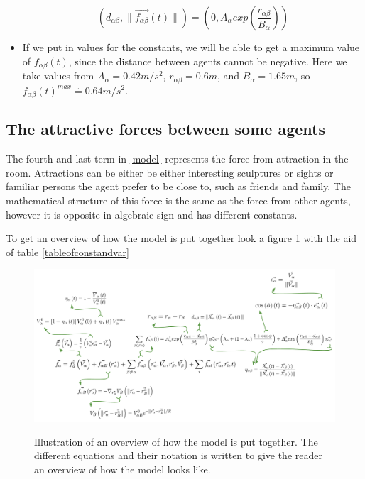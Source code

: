 \begin{itemize}
\begin{equation}
	\left( d_{\alpha \beta} , \| \vec{f_{\alpha \beta}} \left( t \right) \| \right)
 =
	\left( 0 , A_{\alpha} exp\left( \frac{r_{\alpha\beta} }{B_{\alpha}}\right)  \right) 
\end{equation}

\item If we put in values for the constants, we will be able to get a maximum value of $ f_{\alpha\beta}(t) $, 
since the distance between agents cannot be negative. Here we take values from \cite{ABconstant} $ A_{\alpha} = 0.42 m/s^{2} $, 
$ r_{\alpha\beta} = 0.6 m $, and $ B_{\alpha} = 1.65 m $, so 
$ f_{\alpha\beta}(t)^{max} \doteq 0.64 m/s^{2} $.

\end{itemize}



\subsection{The attractive forces between some agents}
The fourth and last term in \eqref{model} represents the force from attraction 
in the room. Attractions can be either be either interesting sculptures or 
sights or familiar persons the agent prefer to be close to, such as friends 
and family. The mathematical structure of this force is the same as the force 
from other agents, however it is opposite in algebraic sign and has different 
constants. 

To get an overview of how the model is put together look a figure \ref{overview}
with the aid of table \ref{tableofconstandvar}

\begin{figure}[hb] %
    \centering
    {\includegraphics[scale=0.45]{Figures/overview.pdf}} 
    \caption[Overview of the model]{Illustration of an overview of how the model is put together. The different equations and their notation is written to give the 
	     reader an overview of how the model looks like.}
    \label{overview}
\end{figure}